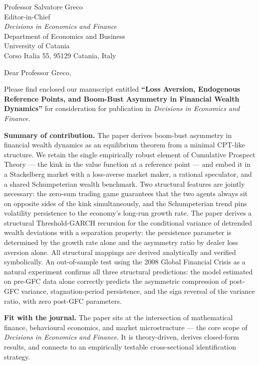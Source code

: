 \documentclass[12pt,a4paper]{article}
\begin{document}
\thispagestyle{empty}

\noindent
Professor Salvatore Greco\\
Editor-in-Chief\\
\textit{Decisions in Economics and Finance}\\
Department of Economics and Business\\
University of Catania\\
Corso Italia 55, 95129 Catania, Italy

\vspace{1cm}

\noindent Dear Professor Greco,

\vspace{0.4cm}

Please find enclosed our manuscript entitled \textbf{``Loss Aversion, Endogenous
Reference Points, and Boom-Bust Asymmetry in Financial Wealth Dynamics''} for
consideration for publication in \textit{Decisions in Economics and Finance}.

\textbf{Summary of contribution.} The paper derives boom-bust asymmetry in
financial wealth dynamics as an equilibrium theorem from a minimal
CPT-like structure. We retain the single empirically robust element of
Cumulative Prospect Theory --- the kink in the value function at a reference
point --- and embed it in a Stackelberg market with a loss-averse market maker,
a rational speculator, and a shared Schumpeterian wealth benchmark. Two
structural features are jointly necessary: the zero-sum trading game guarantees
that the two agents always sit on opposite sides of the kink simultaneously,
and the Schumpeterian trend pins volatility persistence to the economy's
long-run growth rate. The paper derives a structural Threshold-GARCH recursion
for the conditional variance of detrended wealth deviations with a separation
property: the persistence parameter is determined by the growth rate alone and
the asymmetry ratio by dealer loss aversion alone. All structural mappings are
derived analytically and verified symbolically. An out-of-sample test
using the 2008 Global Financial Crisis as a natural experiment confirms
all three structural predictions: the model estimated on pre-GFC data
alone correctly predicts the asymmetric compression of post-GFC variance,
stagnation-period persistence, and the sign reversal of the variance
ratio, with zero post-GFC parameters.

\textbf{Fit with the journal.} The paper sits at the intersection of
mathematical finance, behavioural economics, and market microstructure ---
the core scope of \textit{Decisions in Economics and Finance}. It is
theory-driven, derives closed-form results, and connects to an empirically
testable cross-sectional identification strategy.
\end{document}
